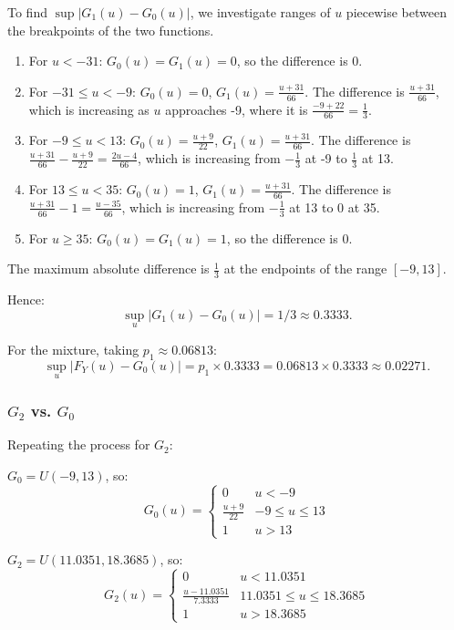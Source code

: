 \documentclass{article}
\begin{document}
To find \(\sup|G_1(u)-G_0(u)|\), we investigate ranges of \(u\) piecewise between the breakpoints of the two functions.

\begin{enumerate}
    \item For \(u < -31\): \(G_0(u) = G_1(u) = 0\), so the difference is 0.
    \item For \(-31 \le u < -9\): \(G_0(u) = 0\), \(G_1(u) = \frac{u+31}{66}\). The difference is \(\frac{u+31}{66}\), which is increasing as \(u\) approaches -9, where it is \(\frac{-9 + 22}{66} = \frac{1}{3}\).
    \item For \(-9 \le u < 13\): \(G_0(u) = \frac{u+9}{22}\), \(G_1(u) = \frac{u+31}{66}\). The difference is \(\frac{u+31}{66} - \frac{u+9}{22} = \frac{2u-4}{66}\), which is increasing from \(-\frac{1}{3}\) at -9 to \(\frac{1}{3}\) at 13.
    \item For \(13 \le u < 35\): \(G_0(u) = 1\), \(G_1(u) = \frac{u+31}{66}\). The difference is \(\frac{u+31}{66} - 1 = \frac{u-35}{66}\), which is increasing from \(-\frac{1}{3}\) at 13 to 0 at 35.
    \item For \(u \ge 35\): \(G_0(u) = G_1(u) = 1\), so the difference is 0.
\end{enumerate}

The maximum absolute difference is \(\frac{1}{3}\) at the endpoints of the range \([-9,13]\).

Hence:
\[
\sup_u|G_1(u)-G_0(u)| = 1/3 \approx 0.3333.
\]

For the mixture, taking \(p_1 \approx 0.06813\):
\[
\sup_u|F_Y(u)-G_0(u)| = p_1 \times 0.3333 = 0.06813 \times 0.3333 \approx 0.02271.
\]

\subsubsection{\(G_2\) vs. \(G_0\)}

Repeating the process for \(G_2\):

\(G_0 = U(-9, 13)\), so:
\[
G_0(u)=\begin{cases}
0 & u < -9 \\
\frac{u+9}{22} & -9 \le u \le 13 \\
1 & u > 13
\end{cases}
\]

\(G_2 = U(11.0351, 18.3685)\), so:
\[
G_2(u)=\begin{cases}
0 & u < 11.0351 \\
\frac{u-11.0351}{7.3333} & 11.0351 \le u \le 18.3685 \\
1 & u > 18.3685
\end{cases}
\]
\end{document}
